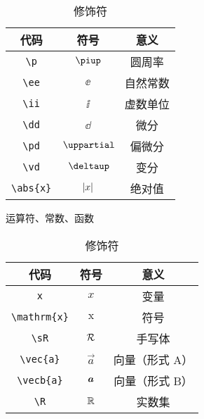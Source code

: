 \documentclass[shortmath]{AirNote}
\begin{document}
\begin{table}[htb]
\begin{minipage}{0.48\textwidth}
\centering
\begin{tabular}{ccc}
\toprule
代码 & 符号 & 意义\\
\midrule
\verb|\p| & $\p$ & 圆周率\\
\verb|\ee| & $\ee$ & 自然常数\\
\verb|\ii| & $\ii$ & 虚数单位\\
\verb|\dd| & $\dd$ & 微分\\
\verb|\pd| & $\pd$ & 偏微分\\
\verb|\vd| & $\vd$ & 变分\\
\verb|\abs{x}| & $\left\lvert x \right\rvert$ & 绝对值\\
\bottomrule
\end{tabular}
\caption{运算符、常数、函数}
\end{minipage}
\begin{minipage}{0.48\textwidth}
\centering
\begin{tabular}{ccc}
\toprule
代码 & 符号 & 意义\\
\midrule
\verb|x| & $x$ & 变量\\
\verb|\mathrm{x}| & $\mathrm{x}$ & 符号\\
\verb|\sR| & $\mathcal{R}$ & 手写体\\
\verb|\vec{a}| & $\vec{a}$ & 向量（形式 A）\\
\verb|\vecb{a}| &$\bm{a}$ & 向量（形式 B）\\
\verb|\R| & $\mathbb{R}$ & 实数集\\
\bottomrule
\end{tabular}
\caption{修饰符}
\end{minipage}
\end{table}
\end{document}
